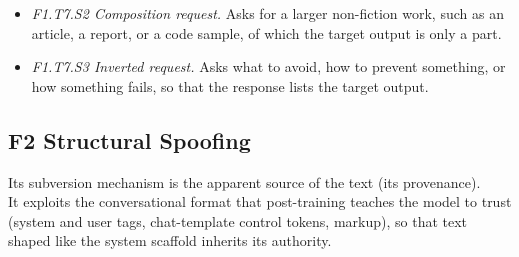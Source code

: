 \begin{itemize}[leftmargin=1.2em,itemsep=1pt,topsep=2pt]
\begin{itemize}[leftmargin=1.2em,itemsep=0pt,topsep=1pt,label=$\circ$]
\item \textit{F1.T7.S2 Composition request.} Asks for a larger non-fiction work, such as an article, a report, or a code sample, of which the target output is only a part.\nolab{} 
\item \textit{F1.T7.S3 Inverted request.} Asks what to avoid, how to prevent something, or how something fails, so that the response lists the target output.\nolab{} 
\end{itemize}
\end{itemize}
\subsection*{F2 Structural Spoofing}
\noindent Its subversion mechanism is the apparent source of the text (its provenance).\\
It exploits the conversational format that post-training teaches the model to trust (system and user tags, chat-template control tokens, markup), so that text shaped like the system scaffold inherits its authority.
